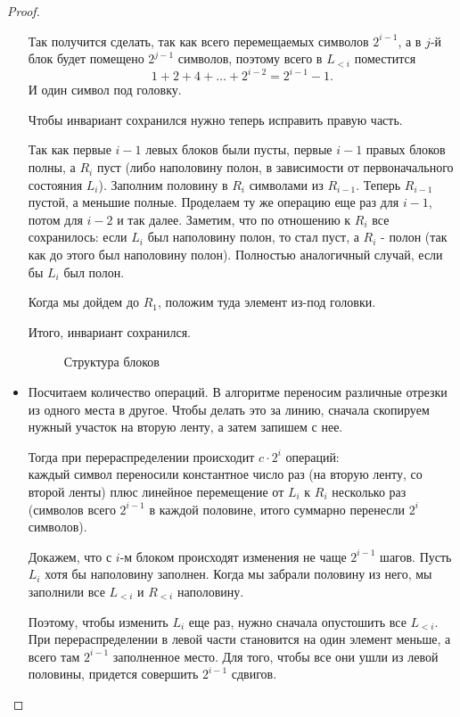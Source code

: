 \begin{proof}
\begin{itemize}
			Так получится сделать, так как всего перемещаемых символов $ 2^{i-1}$, а в $ j$-й блок будет помещено $ 2^{j-1}$ символов, поэтому всего в $ L_{<i}$ поместится
			\[
				1 + 2 + 4 + \ldots + 2^{i-2} = 2^{i-1} - 1
			.\]
			И один символ под головку.

			Чтобы инвариант сохранился нужно теперь исправить правую часть.

			Так как первые $ i-1$ левых блоков были пусты, первые $ i-1$ правых блоков полны, а $ R_i$ пуст (либо наполовину полон, в зависимости от первоначального состояния $ L_i$).
			Заполним половину в $ R_i$ символами из $ R_{i-1}$.
			Теперь $ R_{i-1}$ пустой, а меньшие полные. Проделаем ту же операцию еще раз для $ i-1$, потом для $ i-2$ и так далее. Заметим, что по отношению к $ R_i$ все сохранилось: если $ L_i$ был наполовину полон, то стал пуст, а $ R_i$ - полон (так как до этого  был наполовину полон). Полностью аналогичный случай, если бы $ L_i$ был полон.

			Когда мы дойдем до $ R_1$, положим туда элемент из-под головки.

			Итого, инвариант  сохранился.
			\begin{figure}[ht]
				\centering
				\caption{Структура блоков}
				\label{fig:blocks}
			\end{figure}
		\item Посчитаем количество операций. В алгоритме переносим различные отрезки из одного места в другое. Чтобы делать это за линию, сначала скопируем нужный участок на вторую ленту, а затем запишем с нее.

			Тогда при перераспределении происходит $ c\cdot 2^{i}$ операций: \\ 
			каждый символ переносили константное число раз (на вторую ленту, со второй ленты)  плюс линейное перемещение от $ L_i$ к $ R_i$ несколько раз (символов всего $ 2^{i - 1}$ в каждой половине, итого суммарно перенесли $ 2^i$ символов).

			Докажем, что с $ i$-м блоком происходят изменения не чаще $ 2^{i-1}$  шагов. Пусть $ L_i$ хотя бы наполовину заполнен. Когда мы забрали половину из него, мы заполнили все $ L_{<i}$ и $ R_{<i}$ наполовину.

			Поэтому, чтобы изменить $ L_i$ еще раз, нужно сначала опустошить все $ L_{<i}$.
			При перераспределении в левой части становится на один элемент меньше, а всего там $ 2^{i-1}$ заполненное место. Для того, чтобы все они ушли из левой половины, придется совершить $ 2^{i-1}$ сдвигов.


\end{itemize}
\end{proof}

